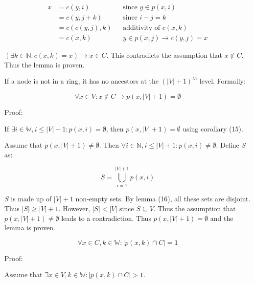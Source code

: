 \documentclass[11pt]{article}
\begin{document}
    \begin{align*}
        \text{$x$} &= \text{$c(y,i)$} && \text{since $y \in p(x,i)$} \\
        &= \text{$c(y,j+k)$} && \text{since $i-j=k$} \\
        &= \text{$c(c(y,j),k)$} && \text{additivity of $c(x,k)$} \\
        &= \text{$c(x,k)$} && \text{$y \in p(x,j) \rightarrow c(y,j)=x$}
    \end{align*}

    $(\exists k\in \mathbb{N}: c(x,k)=x) \rightarrow x \in C$. This contradicts the assumption that $x \not \in C$. Thus the lemma is proven.



    If a node is not in a ring, it has no ancestors at the $(|V|+1)^{th}$ level. Formally:

    \begin{equation}
        \forall x \in V: x \not \in C \rightarrow p(x,|V|+1) = \emptyset
    \end{equation}


    Proof:

    If $\exists i\in \mathbb{W},i\leq |V|+1: p(x,i)=\emptyset$, then $p(x,|V|+1)=\emptyset$ using corollary (15).

    Assume that $p(x,|V|+1) \not = \emptyset$. Then $\forall i \in \mathbb{N}, i\leq |V|+1: p(x,i) \not = \emptyset$. Define $S$ as:


    \begin{equation*}
        S = \bigcup_{i=1}^{|V|+1}p(x,i)
    \end{equation*}

    $S$ is made up of $|V|+1$ non-empty sets. By lemma (16), all these sets are disjoint. Thus $|S|\geq|V|+1$. However, $|S|<|V|$ since $S \subseteq V$. Thus the assumption that $p(x,|V|+1) \not = \emptyset$ leads to a contradiction. Thus $p(x,|V|+1) = \emptyset$ and the lemma is proven.

    \begin{equation}
        \forall x \in C, k \in \mathbb{W}: |p(x,k) \cap C|=1
    \end{equation}

    Proof:

    Assume that $\exists x \in V,k \in \mathbb{W}: |p(x,k) \cap C|>1$.
\end{document}
